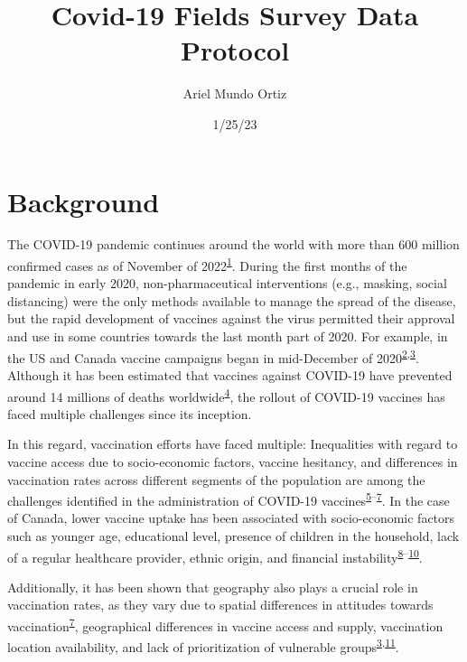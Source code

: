 \documentclass[
  letterpaper,
  DIV=11,
  numbers=noendperiod]{scrartcl}
\title{Covid-19 Fields Survey Data Protocol}
\author{Ariel Mundo Ortiz}
\date{1/25/23}
\begin{document}
\maketitle
\ifdefined\Shaded\renewenvironment{Shaded}{\begin{tcolorbox}[interior hidden, borderline west={3pt}{0pt}{shadecolor}, sharp corners, enhanced, breakable, boxrule=0pt, frame hidden]}{\end{tcolorbox}}\fi

\hypertarget{background}{%
\section{Background}\label{background}}

The COVID-19 pandemic continues around the world with more than 600
million confirmed cases as of November of
2022\textsuperscript{\protect\hyperlink{ref-WHO-Covid}{1}}. During the
first months of the pandemic in early 2020, non-pharmaceutical
interventions (e.g., masking, social distancing) were the only methods
available to manage the spread of the disease, but the rapid development
of vaccines against the virus permitted their approval and use in some
countries towards the last month part of 2020. For example, in the US
and Canada vaccine campaigns began in mid-December of
2020\textsuperscript{\protect\hyperlink{ref-tanne2020}{2},\protect\hyperlink{ref-bogoch2022}{3}}.
Although it has been estimated that vaccines against COVID-19 have
prevented around 14 millions of deaths
worldwide\textsuperscript{\protect\hyperlink{ref-watson2022}{4}}, the
rollout of COVID-19 vaccines has faced multiple challenges since its
inception.

In this regard, vaccination efforts have faced multiple: Inequalities
with regard to vaccine access due to socio-economic factors, vaccine
hesitancy, and differences in vaccination rates across different
segments of the population are among the challenges identified in the
administration of COVID-19
vaccines\textsuperscript{\protect\hyperlink{ref-gerretsen2021}{5}--\protect\hyperlink{ref-malik2020}{7}}.
In the case of Canada, lower vaccine uptake has been associated with
socio-economic factors such as younger age, educational level, presence
of children in the household, lack of a regular healthcare provider,
ethnic origin, and financial
instability\textsuperscript{\protect\hyperlink{ref-guay2022}{8}--\protect\hyperlink{ref-carter2022}{10}}.

Additionally, it has been shown that geography also plays a crucial role
in vaccination rates, as they vary due to spatial differences in
attitudes towards
vaccination\textsuperscript{\protect\hyperlink{ref-malik2020}{7}},
geographical differences in vaccine access and supply, vaccination
location availability, and lack of prioritization of vulnerable
groups\textsuperscript{\protect\hyperlink{ref-bogoch2022}{3},\protect\hyperlink{ref-nguyen2021}{11}}.
\end{document}
